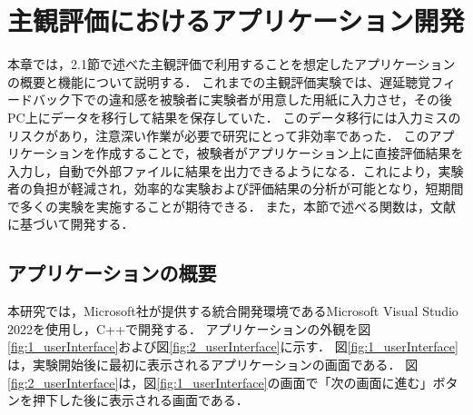 \chapter{主観評価におけるアプリケーション開発}
本章では，2.1節で述べた主観評価で利用することを想定したアプリケーションの概要と機能について説明する．
これまでの主観評価実験では、遅延聴覚フィードバック下での違和感を被験者に実験者が用意した用紙に入力させ，その後PC上にデータを移行して結果を保存していた．
このデータ移行には入力ミスのリスクがあり，注意深い作業が必要で研究にとって非効率であった．
このアプリケーションを作成することで，被験者がアプリケーション上に直接評価結果を入力し，自動で外部ファイルに結果を出力できるようになる．これにより，実験者の負担が軽減され，効率的な実験および評価結果の分析が可能となり，短期間で多くの実験を実施することが期待できる．
また，本節で述べる関数は，文献\cite{Win32API-reference}に基づいて開発する．

\section{アプリケーションの概要}
本研究では，Microsoft社が提供する統合開発環境であるMicrosoft Visual Studio 2022を使用し，C++で開発する．
アプリケーションの外観を図\ref{fig:1_userInterface}および図\ref{fig:2_userInterface}に示す．
図\ref{fig:1_userInterface}は，実験開始後に最初に表示されるアプリケーションの画面である．
図\ref{fig:2_userInterface}は，図\ref{fig:1_userInterface}の画面で「次の画面に進む」ボタンを押下した後に表示される画面である．

